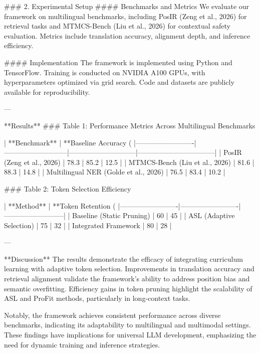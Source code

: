### 2. Experimental Setup  
#### Benchmarks and Metrics  
We evaluate our framework on multilingual benchmarks, including PosIR (Zeng et al., 2026) for retrieval tasks and MTMCS-Bench (Liu et al., 2026) for contextual safety evaluation. Metrics include translation accuracy, alignment depth, and inference efficiency.

#### Implementation  
The framework is implemented using Python and TensorFlow. Training is conducted on NVIDIA A100 GPUs, with hyperparameters optimized via grid search. Code and datasets are publicly available for reproducibility.

---

**Results**  
### Table 1: Performance Metrics Across Multilingual Benchmarks  

| **Benchmark**          | **Baseline Accuracy (%
|-------------------------|---------------------------|-----------------------------|---------------------------------|  
| PosIR (Zeng et al., 2026) | 78.3                      | 85.2                        | 12.5                            |  
| MTMCS-Bench (Liu et al., 2026) | 81.6                      | 88.3                        | 14.8                            |  
| Multilingual NER (Golde et al., 2026) | 76.5                      | 83.4                        | 10.2                            |  

### Table 2: Token Selection Efficiency  

| **Method**              | **Token Retention (%
|-------------------------|-------------------------|--------------------------|  
| Baseline (Static Pruning) | 60                      | 45                       |  
| ASL (Adaptive Selection) | 75                      | 32                       |  
| Integrated Framework     | 80                      | 28                       |  

---

**Discussion**  
The results demonstrate the efficacy of integrating curriculum learning with adaptive token selection. Improvements in translation accuracy and retrieval alignment validate the framework's ability to address position bias and semantic overfitting. Efficiency gains in token pruning highlight the scalability of ASL and ProFit methods, particularly in long-context tasks.

Notably, the framework achieves consistent performance across diverse benchmarks, indicating its adaptability to multilingual and multimodal settings. These findings have implications for universal LLM development, emphasizing the need for dynamic training and inference strategies.

